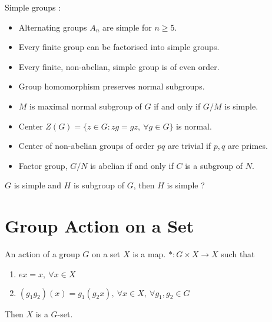 \begin{remark} Simple groups :
\begin{itemize}
	\item Alternating groups $A_n$ are simple for $n \ge 5$.%
	\item Every finite group can be factorised into simple groups.%
	\item Every finite, non-abelian, simple group is of even order.%
	\item Group homomorphism preserves normal subgroups.%
	\item $M$ is maximal normal subgroup of $G$ if and only if $G/M$ is simple.%
	\item Center $Z(G) = \{ z \in G : zg = gz,\ \forall g \in G \}$ is normal.%
	\item Center of non-abelian groups of order $pq$ are trivial if $p,q$ are primes.%
	\item Factor group, $G/N$ is abelian if and only if $C$ is a subgroup of $N$.%
\end{itemize}
\end{remark}

\begin{question}
	$G$ is simple and $H$ is subgroup of $G$, then $H$ is simple ?
\end{question}


\section{Group Action on a Set}
\begin{definition}%
	An action of a group $G$ on a set $X$ is a map.
	$\ast : G \times X \to X$ such that
	\begin{enumerate}
		\item $ex = x,\ \forall x \in X$
		\item $(g_1g_2)(x) = g_1(g_2x),\ \forall x \in X,\ \forall g_1,g_2 \in G$
	\end{enumerate}
	Then $X$ is a $G$-set.
\end{definition}

